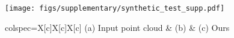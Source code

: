 \begin{figure}[t]
  \centering
  \texttt{[image: figs/supplementary/synthetic\_test\_supp.pdf]}
    \begin{tblr}{colspec={X[c]X[c]X[c]}}
        \scriptsize{(a) Input point cloud} & \scriptsize{(b) \nksr} & \scriptsize{(c) Ours} \\
    \end{tblr} 
\caption{ }
\label{fig:synthetic_additional_1}
\end{figure}
